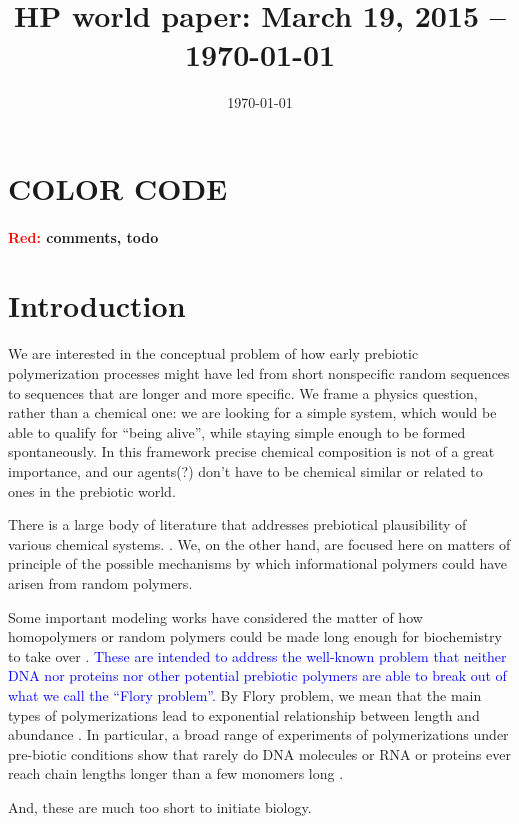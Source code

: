 \documentclass[12pt]{paper}
\title{HP world paper: March 19, 2015 -- \today}
\author{}
\date{\today}
\newcommand{\red}[1]{\textcolor{red}{#1}}
\newcommand{\blue}[1]{\textcolor{blue}{#1}}
\begin{document}
 \maketitle
 \tableofcontents
 
 \section*{COLOR CODE}
\paragraph{\red{Red: }comments, todo}
 
\section{Introduction} 
We are interested in the conceptual problem of how early prebiotic polymerization processes 
might have led from short nonspecific random sequences to sequences that are longer and more specific.  
We frame a physics question, rather than a chemical one:  we are looking for a simple system, 
which would be able to qualify for ``being alive'',  while staying simple enough to be formed 
spontaneously. In this framework precise chemical composition is not of a great importance, and 
our agents(?) don't have to be chemical similar or related to ones in the prebiotic world.

There is a large body of literature that addresses prebiotical plausibility of various chemical 
systems. \cite{Orgel,}.  
We, on the other hand, are focused here on matters of principle of the possible mechanisms 
by which informational polymers could have arisen from random polymers.  

Some important modeling works have considered the matter of how homopolymers or random 
polymers could be made long enough for biochemistry to take over \cite{}.  
\blue{These are intended to address the well-known problem that neither DNA \cite{} nor proteins 
  \cite{} nor other potential prebiotic polymers \cite{} are able to break out of what we call the 
  ``Flory problem''. }
By Flory problem, we mean that the main types of polymerizations lead to exponential relationship
between length and abundance \cite{Flory1953,??}.  In particular, a broad range of experiments 
of  polymerizations under pre-biotic conditions show that rarely do DNA molecules or RNA 
or proteins ever reach chain lengths longer than a few monomers long \cite{}.  

And, these are much too short to initiate biology. 
\end{document}
